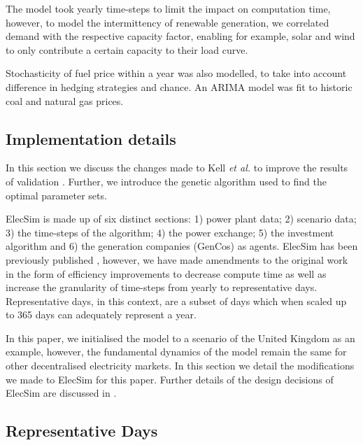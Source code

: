 The model took yearly time-steps to limit the impact on computation time, however, to model the intermittency of renewable generation, we correlated demand with the respective capacity factor, enabling for example, solar and wind to only contribute a certain capacity to their load curve.

Stochasticity of fuel price within a year was also modelled, to take into account difference in hedging strategies and chance. An ARIMA model \cite{ARIMA} was fit to historic coal and natural gas prices.




\subsection{Implementation details}
\label{sec:details}

In this section we discuss the changes made to Kell \textit{et al.} to improve the results of validation \cite{Kell}. Further, we introduce the genetic algorithm used to find the optimal parameter sets.


ElecSim is made up of six distinct sections: 1) power plant data; 2) scenario data; 3) the time-steps of the algorithm; 4) the power exchange; 5) the investment algorithm and 6) the generation companies (GenCos) as agents. ElecSim has been previously published \cite{Kell}, however, we have made amendments to the original work in the form of  efficiency improvements to decrease compute time as well as increase the granularity of time-steps from yearly to representative days.  Representative days, in this context, are a subset of days which when scaled up to 365 days can adequately represent a year. 

In this paper, we initialised the model to a scenario of the United Kingdom as an example, however, the fundamental dynamics of the model remain the same for other decentralised electricity markets. In this section we detail the modifications we made to ElecSim for this paper. Further details of the design decisions of ElecSim are discussed in \cite{Kell}.


\subsection{Representative Days}
\label{ssec:representative_days}

